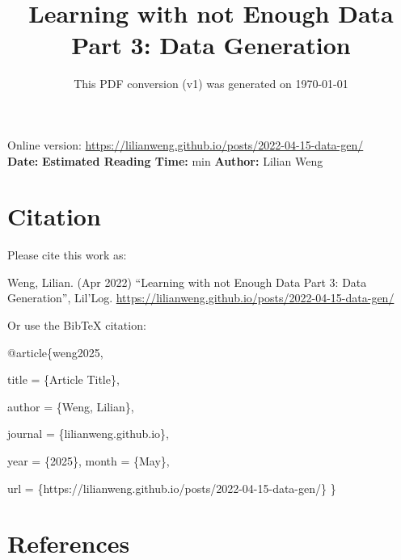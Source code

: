 \documentclass[12pt]{article}
\title{Learning with not Enough Data Part 3: Data Generation}
\date{This PDF conversion (v1) was generated on \today\footnotemark}
\begin{document}
\maketitle
\begin{center}
    Online version: \url{https://lilianweng.github.io/posts/2022-04-15-data-gen/} \\
    \textbf{Date:} \quad
    \textbf{Estimated Reading Time:}  min \quad
    \textbf{Author:} Lilian Weng
\end{center}




\newpage
\tableofcontents
\newpage
\vspace{1em}
\n\n\n\section{Citation}
Please cite this work as:

\begin{tcolorbox}[colback=black!5!white, colframe=black!80!white, boxrule=0.5pt, arc=2mm, left=1mm, right=1mm, top=1mm, bottom=1mm]
  Weng, Lilian. (Apr 2022) ``Learning with not Enough Data Part 3: Data Generation'', Lil'Log. \url{https://lilianweng.github.io/posts/2022-04-15-data-gen/}
  \end{tcolorbox}

Or use the BibTeX citation:

\begin{tcolorbox}[
    colback=black!5!white,
    colframe=black!80!white,
    boxrule=0.5pt,
    arc=2mm,
    left=1mm,
    right=1mm,
    top=1mm,
    bottom=1mm,
    listing only,
    listing options={
      basicstyle=\ttfamily\footnotesize,
      breaklines=true,
      literate={\{}{{\char`\{}}1 {\}}{{\char`\}}}1
    }
  ]
  @article\{weng2025,

    title   = \{Article Title\},

    author  = \{Weng, Lilian\},

    journal = \{lilianweng.github.io\},

    year    = \{2025\},
    month   = \{May\},

    url     = \{https://lilianweng.github.io/posts/2022-04-15-data-gen/\}\n
  \}
  \end{tcolorbox}

\newpage
\section{References}

\n
\end{document}
